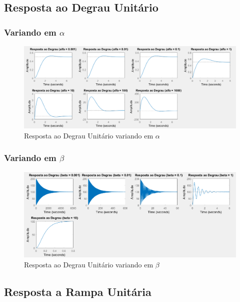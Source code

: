 \documentclass[a4paper, 12pt]{article}
\begin{document}
		\subsection{Resposta ao Degrau Unitário}		
			\subsubsection{Variando em $\alpha$}
			\begin{figure}[!ht]
				\centering
				\includegraphics[scale=0.45]{img/3d_alfa.png}
				\caption{Resposta ao Degrau Unitário variando em $\alpha$}	
			\end{figure}				
			\subsubsection{Variando em $\beta$}
			\begin{figure}[!ht]
				\centering
				\includegraphics[scale=0.5]{img/3d_beta.png}
				\caption{Resposta ao Degrau Unitário variando em $\beta$}	
			\end{figure}	
    	\newpage				
		\subsection{Resposta a Rampa Unitária}		
\end{document}
